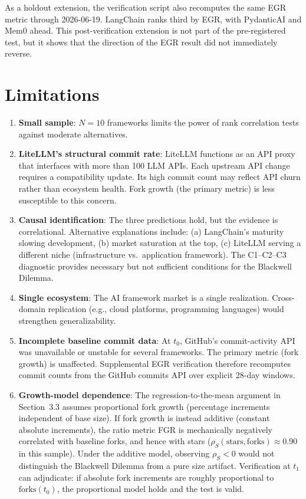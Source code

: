 \documentclass[12pt]{article}
\begin{document}
As a holdout extension, the verification script also recomputes the same EGR metric through 2026-06-19. LangChain ranks third by EGR, with PydanticAI and Mem0 ahead. This post-verification extension is not part of the pre-registered test, but it shows that the direction of the EGR result did not immediately reverse.

\section{Limitations}

\begin{enumerate}
\item \textbf{Small sample}: $N = 10$ frameworks limits the power of rank correlation tests against moderate alternatives.

\item \textbf{LiteLLM's structural commit rate}: LiteLLM functions as an API proxy that interfaces with more than 100 LLM APIs. Each upstream API change requires a compatibility update. Its high commit count may reflect API churn rather than ecosystem health. Fork growth (the primary metric) is less susceptible to this concern.

\item \textbf{Causal identification}: The three predictions hold, but the evidence is correlational. Alternative explanations include: (a) LangChain's maturity slowing development, (b) market saturation at the top, (c) LiteLLM serving a different niche (infrastructure vs.\ application framework). The C1--C2--C3 diagnostic provides necessary but not sufficient conditions for the Blackwell Dilemma.

\item \textbf{Single ecosystem}: The AI framework market is a single realization. Cross-domain replication (e.g., cloud platforms, programming languages) would strengthen generalizability.

\item \textbf{Incomplete baseline commit data}: At $t_0$, GitHub's commit-activity API was unavailable or unstable for several frameworks. The primary metric (fork growth) is unaffected. Supplemental EGR verification therefore recomputes commit counts from the GitHub commits API over explicit 28-day windows.

\item \label{lim:rtm} \textbf{Growth-model dependence}: The regression-to-the-mean argument in Section~3.3 assumes proportional fork growth (percentage increments independent of base size). If fork growth is instead additive (constant absolute increments), the ratio metric FGR is mechanically negatively correlated with baseline forks, and hence with stars ($\rho_S(\text{stars}, \text{forks}) \approx 0.90$ in this sample). Under the additive model, observing $\rho_S < 0$ would not distinguish the Blackwell Dilemma from a pure size artifact. Verification at $t_1$ can adjudicate: if absolute fork increments are roughly proportional to $\text{forks}(t_0)$, the proportional model holds and the test is valid.
\end{enumerate}
\end{document}
